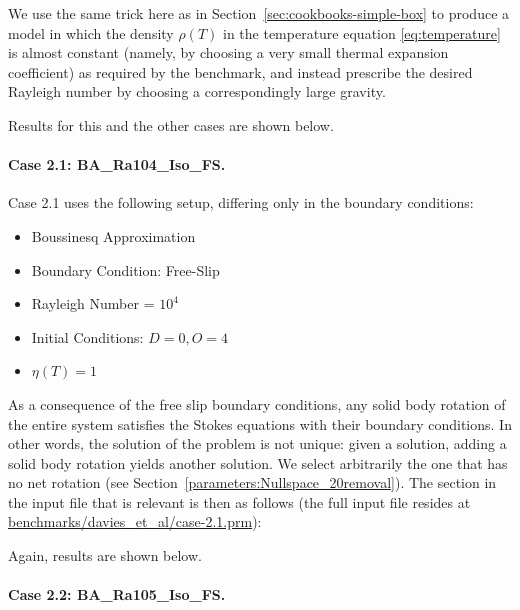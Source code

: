 \documentclass{article}
\begin{document}


We use the same trick here as in Section~\ref{sec:cookbooks-simple-box} to
produce a model in which the density $\rho(T)$ in the temperature equation
\eqref{eq:temperature} is almost constant (namely, by choosing a very small
thermal expansion coefficient) as required by the benchmark, and instead
prescribe the desired Rayleigh number by choosing a correspondingly large
gravity.

Results for this and the other cases are shown below.


\paragraph{Case 2.1: BA\_Ra104\_Iso\_FS.}
\label{sec:davies-case21_BA}

Case 2.1 uses the following setup, differing only in the boundary conditions:
\begin{itemize}
\item Boussinesq Approximation
\item Boundary Condition: Free-Slip
\item Rayleigh Number = $10^4$ 
\item Initial Conditions: $D = 0, O = 4$
\item $\eta(T) = 1$
\end{itemize}

As a consequence of the free slip boundary conditions, any solid body rotation
of the entire system satisfies the Stokes equations with their boundary
conditions. In other words, the solution of the problem is not unique: given a
solution, adding a solid body rotation yields another solution. We select
arbitrarily the one that has no net rotation (see
Section~\ref{parameters:Nullspace_20removal}). The section in the input file
that is relevant is then as follows (the full input file resides at
\url{benchmarks/davies_et_al/case-2.1.prm}):



Again, results are shown below.


\paragraph{Case 2.2: BA\_Ra105\_Iso\_FS.}
\label{sec:davies-case22_BA}
\end{document}
